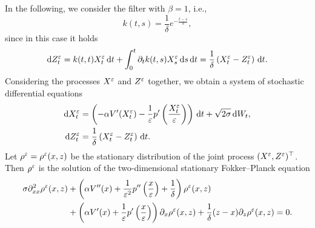 \documentclass[10pt]{article}
\begin{document}
In the following, we consider the filter with $\beta = 1$, i.e.,
\begin{equation}
	k(t,s) = \frac{1}{\delta} e^{-\frac{t-s}{\delta}},
\end{equation}
since in this case it holds
\begin{equation}
	\mathrm{d} Z^\varepsilon_t = k(t,t) X^\varepsilon_t \,\mathrm{d} t + \int_0^t \partial_t k(t,s) X^\varepsilon_s \,\mathrm{d} s \,\mathrm{d} t = \frac{1}{\delta} \left ( X^\varepsilon_t - Z^\varepsilon_t \right ) \,\mathrm{d} t.
\end{equation}
Considering the processes $X^\varepsilon$ and $Z^\varepsilon$ together, we obtain a system of stochastic differential equations
\begin{equation}
\label{systemSDE}
\begin{aligned}
\mathrm{d} X^\varepsilon_t &= \left ( - \alpha V'(X^\varepsilon_t) - \frac{1}{\varepsilon} p' \left ( \frac{X^\varepsilon_t}{\varepsilon} \right ) \right ) \,\mathrm{d} t + \sqrt{2\sigma} \,\mathrm{d} W_t, \\
\mathrm{d} Z^\varepsilon_t &= \frac{1}{\delta} \left ( X^\varepsilon_t - Z^\varepsilon_t \right ) \,\mathrm{d} t.
\end{aligned}
\end{equation}
Let $\rho^\varepsilon = \rho^\varepsilon(x,z)$ be the stationary distribution of the joint process $(X^\varepsilon, Z^\varepsilon)^\top$. Then $\rho^\varepsilon$ is the solution of the two-dimensional stationary Fokker--Planck equation
\begin{equation}
\begin{aligned}
	\label{eq:FPsystem}
	\sigma \partial^2_{xx} \rho^\varepsilon(x,z) & + \left ( \alpha V''(x) + \frac{1}{\varepsilon^2} p'' \left ( \frac{x}{\varepsilon} \right ) + \frac{1}{\delta} \right ) \rho^\varepsilon(x,z) \\
	& + \left ( \alpha V'(x) + \frac{1}{\varepsilon} p' \left ( \frac{x}{\varepsilon} \right ) \right ) \partial_x \rho^\varepsilon(x,z) + \frac{1}{\delta}(z - x) \partial_z \rho^\varepsilon(x,z) = 0.
\end{aligned}
\end{equation}
\end{document}
